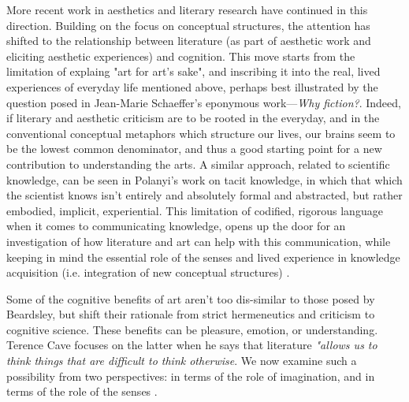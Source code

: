 More recent work in aesthetics and literary research have continued in this direction. Building on the focus on conceptual structures, the attention has shifted to the relationship between literature (as part of aesthetic work and eliciting aesthetic experiences) and cognition. This move starts from the limitation of explaing "art for art's sake", and inscribing it into the real, lived experiences of everyday life mentioned above, perhaps best illustrated by the question posed in Jean-Marie Schaeffer's eponymous work—\emph{Why fiction?}. Indeed, if literary and aesthetic criticism are to be rooted in the everyday, and in the conventional conceptual metaphors which structure our lives, our brains seem to be the lowest common denominator, and thus a good starting point for a new contribution to understanding the arts. A similar approach, related to scientific knowledge, can be seen in Polanyi's work on tacit knowledge, in which that which the scientist knows isn't entirely and absolutely formal and abstracted, but rather embodied, implicit, experiential. This limitation of codified, rigorous language when it comes to communicating knowledge, opens up the door for an investigation of how literature and art can help with this communication, while keeping in mind the essential role of the senses and lived experience in knowledge acquisition (i.e. integration of new conceptual structures) \citep{polanyi_tacit_2009}.

Some of the cognitive benefits of art aren't too dis-similar to those posed by Beardsley, but shift their rationale from strict hermeneutics and criticism to cognitive science. These benefits can be pleasure, emotion, or understanding. Terence Cave focuses on the latter when he says that literature \emph{"allows us to think things that are difficult to think otherwise}. We now examine such a possibility from two perspectives: in terms of the role of imagination, and in terms of the role of the senses \citep{lavocat_interpretation_2015}.

